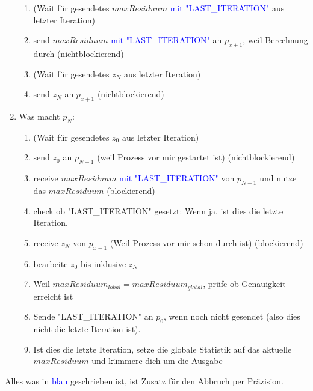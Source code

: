 \documentclass[a4paper,10pt,landscape]{article}
\begin{document}
\begin{enumerate}
\begin{enumerate}
        \item (Wait für gesendetes $maxResiduum$ \textcolor{blue}{mit "LAST\_ITERATION"} aus letzter Iteration)
        \item send $maxResiduum$ \textcolor{blue}{mit "LAST\_ITERATION"} an $p_{x+1}$, weil Berechnung durch (nichtblockierend)
        \item (Wait für gesendetes $z_N$ aus letzter Iteration)
        \item send $z_N$ an $p_{x+1}$ (nichtblockierend)
    \end{enumerate}
    \item Was macht $p_N$:
    \begin{enumerate}
        \item (Wait für gesendetes $z_0$ aus letzter Iteration)
        \item send $z_0$ an $p_{N-1}$ (weil Prozess vor mir gestartet ist) (nichtblockierend)
        \item receive $maxResiduum$ \textcolor{blue}{mit "LAST\_ITERATION"} von $p_{N-1}$ und nutze das $maxResiduum$ (blockierend)
        \color{blue}
        \item check ob "LAST\_ITERATION" gesetzt: Wenn ja, ist dies die letzte Iteration.
        \color{black}
        \item receive $z_N$ von $p_{x-1}$ (Weil Prozess vor mir schon durch ist) (blockierend)
        \item bearbeite $z_0$ bis inklusive $z_{N}$
        \color{blue}
        \item Weil $maxResiduum_{lokal} = maxResiduum_{global}$, prüfe ob Genauigkeit erreicht ist
        \item Sende "LAST\_ITERATION" an $p_0$, wenn noch nicht gesendet (also dies nicht die letzte Iteration ist).
        \color{black}
        \item Ist dies die letzte Iteration, setze die globale Statistik auf das aktuelle $maxResiduum$ und kümmere dich um die Ausgabe
    \end{enumerate}
\end{enumerate}

Alles was in \textcolor{blue}{blau} geschrieben ist, ist Zusatz für den Abbruch per Präzision.
\end{document}

